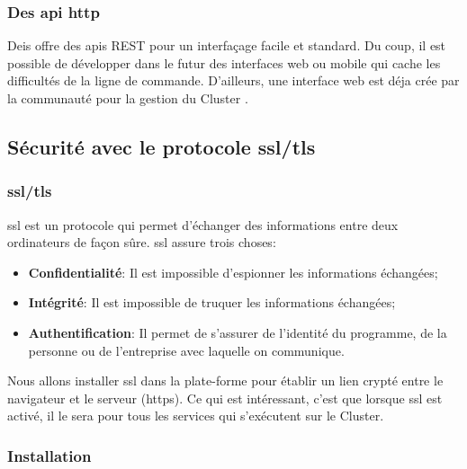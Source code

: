 \begin{onehalfspace}
\subsubsection*{Des \acrshort{api} \acrshort{http}}

Deis offre des \acrshort{api}s REST pour un interfaçage facile et standard. Du coup, il est possible de développer dans le futur des interfaces web ou mobile qui cache les difficultés de la ligne de commande. D'ailleurs, une interface web est déja crée par la communauté pour la gestion du Cluster \cite{deis-ui}.





\subsection{Sécurité avec le protocole \acrshort{ssl}/\acrshort{tls}}

\subsubsection{\acrshort{ssl}/\acrshort{tls}}


\acrshort{ssl} est un protocole qui permet d'échanger des informations entre deux ordinateurs de façon sûre. \acrshort{ssl} assure trois choses:

\begin{itemize}
	\item \textbf{Confidentialité}: Il est impossible d'espionner les informations échangées;
	\item \textbf{Intégrité}: Il est impossible de truquer les informations échangées;
	\item \textbf{Authentification}: Il permet de s'assurer de l'identité du programme, de la personne ou de l'entreprise avec laquelle on communique.
\end{itemize}



Nous allons installer \acrshort{ssl} dans la plate-forme pour établir un lien crypté entre le navigateur et le serveur (\acrshort{https}). Ce qui est intéressant, c'est que lorsque \acrshort{ssl} est activé, il le sera pour tous les services qui s'exécutent sur le Cluster.



\subsubsection{Installation}


\end{onehalfspace}
